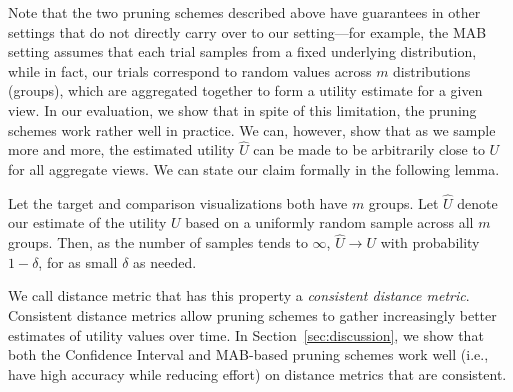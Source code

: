 Note that the two pruning schemes described above have guarantees
in other settings that do not directly carry over to our setting---for example,
the MAB setting assumes that each trial samples from a fixed underlying distribution,
while in fact, our trials correspond to random values across $m$ distributions (groups),
which are aggregated together to form a utility estimate for a given view. 
In our evaluation, we show that in spite of this limitation, the pruning schemes
work rather well in practice. 
We can, however, show that as we sample more and more, the estimated utility
$\hat{U}$ can be made to be arbitrarily close to $U$ for all aggregate views.
We can state our claim formally in the following lemma. 
\vspace{-5pt}
\begin{lemma} [Consistency]
Let the target and comparison visualizations
both have $m$ groups.
Let $\hat{U}$ denote our estimate of the utility $U$ 
based on a uniformly random sample 
across all $m$ groups. 
Then, as the number of samples tends to $\infty$, $\hat{U} \rightarrow U$
with probability $1-\delta$, for as small $\delta$ as needed.
\end{lemma}
\vspace{-5pt}
We call distance metric that has this property a {\em
consistent distance metric}.
Consistent distance metrics allow pruning schemes
to gather increasingly better estimates of utility values
over time. 
In Section~\ref{sec:discussion}, we show that
both the Confidence Interval and MAB-based pruning schemes work
well (i.e., have high accuracy while reducing
effort) 
on distance metrics that are consistent.




